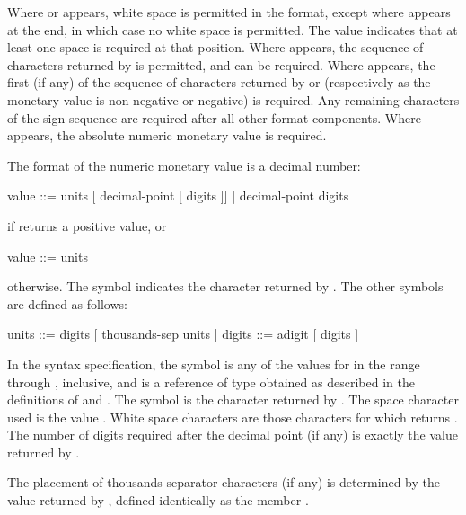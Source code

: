 \pnum
Where
or
appears, white space is permitted in the format,
except where
appears at the end, in which case no white space is permitted.
The value
indicates that at least one space is required at that position.
Where
appears, the sequence of characters returned by
is permitted, and can be required.
Where
appears, the first (if any) of the sequence of characters returned by
or
(respectively as the monetary value is non-negative or negative) is required.
Any remaining characters of the sign sequence are required after all
other format components.
Where
appears, the absolute numeric monetary value is required.

\pnum
The format of the numeric monetary value is a decimal number:
\begin{outputblock}
value ::= units [ decimal-point [ digits ]] |
  decimal-point digits
\end{outputblock}
if
returns a positive value, or
\begin{outputblock}
value ::= units
\end{outputblock}
otherwise.
The symbol
indicates the character returned by
.
The other symbols are defined as follows:

\begin{outputblock}
units ::= digits [ thousands-sep units ]
digits ::= adigit [ digits ]
\end{outputblock}

In the syntax specification, the symbol
is any of the values
for
in the range
through
,
inclusive, and
is a reference of type
obtained as described in the definitions of
and
.
The symbol
is the character returned by
.
The space character used is the value
.
White space characters are those characters
for which
returns
.
The number of digits required after the decimal point (if any)
is exactly the value returned by
.

\pnum
The placement of thousands-separator characters (if any)
is determined by the value returned by
,
defined identically as the member
.

